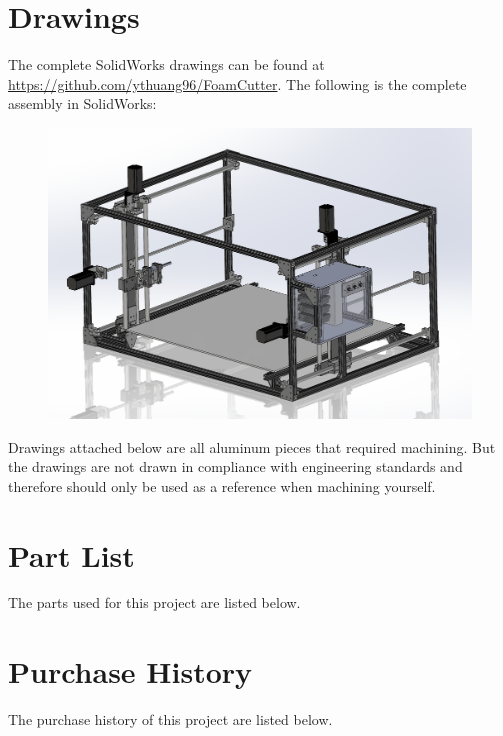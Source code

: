 \documentclass[titlepage,12pt,letter]{report}
\numberwithin{equation}{chapter}
\begin{document}
\begin{appendices}
\chapter{Drawings}
The complete SolidWorks drawings can be found at \\ \href{https://github.com/ythuang96/FoamCutter}{https://github.com/ythuang96/FoamCutter}. The following is the complete assembly in SolidWorks:
 \begin{figure} [H]
 	\includegraphics[width = 0.9\linewidth]{./Figures/SW.png}
 \end{figure}

Drawings attached below are all aluminum pieces that required machining. But the drawings are not drawn in compliance with engineering standards and therefore should only be used as a reference when machining yourself. 


\chapter{Part List}
The parts used for this project are listed below.


\chapter{Purchase History}
The purchase history of this project are listed below.




\end{appendices}
\end{document}
